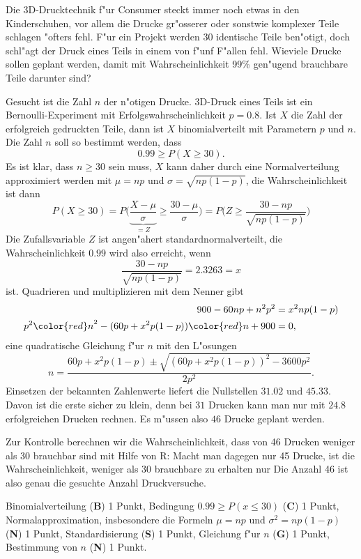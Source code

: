 Die 3D-Drucktechnik f"ur Consumer steckt immer noch etwas in den 
Kinderschuhen, vor allem die Drucke gr"osserer oder sonstwie komplexer
Teile schlagen "ofters fehl.
F"ur ein Projekt werden 30 identische Teile ben"otigt,
doch schl"agt der Druck eines Teils in einem von f"unf F"allen fehl.
Wieviele Drucke sollen geplant werden, damit mit Wahrscheinlichkeit 99\%
gen"ugend brauchbare Teile darunter sind?

\begin{loesung}
Gesucht ist die Zahl $n$ der n"otigen Drucke.
3D-Druck eines Teils ist ein Bernoulli-Experiment mit
Erfolgswahrscheinlichkeit $p=0.8$.
Ist $X$ die Zahl der erfolgreich gedruckten Teile, dann ist $X$
binomialverteilt mit Parametern $p$ und $n$.
Die Zahl $n$ soll so bestimmt werden, dass 
\[
0.99 \ge P(X\ge 30).
\]
Es ist klar, dass $n\ge 30$ sein muss, $X$ kann daher durch eine
Normalverteilung approximiert werden mit $\mu=np$ und $\sigma=\sqrt{np(1-p)}$,
die Wahrscheinlichkeit ist dann
\[
P(X\ge 30)=P\biggl(
\underbrace{\frac{X-\mu}{\sigma}}_{=Z}\ge\frac{30-\mu}{\sigma}
\biggr)
=P\biggl(Z\ge \frac{30-np}{\sqrt{np(1-p)}}\biggr)
\]
Die Zufallsvariable $Z$ ist angen"ahert standardnormalverteilt, die
Wahrscheinlichkeit $0.99$ wird also erreicht, wenn 
\[
\frac{30-np}{\sqrt{np(1-p)}} = 2.3263=x
\]
ist.
Quadrieren und multiplizieren mit dem Nenner gibt
\begin{align*}
900-60np+n^2p^2
&=
x^2 np(1-p)
\\
p^2{\color{red}n}^2-(60p+x^2p(1-p)){\color{red}n}+900&=0,
\end{align*}
eine quadratische Gleichung f"ur $n$ mit den L"osungen
\[
n=\frac{60p+x^2p(1-p)\pm\sqrt{(60p+x^2p(1-p))^2 - 3600p^2}}{2p^2}.
\]
Einsetzen der bekannten Zahlenwerte liefert die Nullstellen $31.02$ und $45.33$.
Davon ist die erste sicher zu klein, denn bei $31$ Drucken kann man nur mit $24.8$ erfolgreichen Drucken rechnen.
Es m"ussen also $46$ Drucke geplant werden.

Zur Kontrolle berechnen wir die Wahrscheinlichkeit, dass von 46 Drucken
weniger als 30 brauchbar sind mit Hilfe von R:
Macht man dagegen nur 45 Drucke, ist die Wahrscheinlichkeit, weniger als
30 brauchbare zu erhalten nur
Die Anzahl 46 ist also genau die gesuchte Anzahl Druckversuche.
\end{loesung}


\begin{bewertung}
Binomialverteilung ({\bf B}) 1 Punkt,
Bedingung $0.99 \ge P(x\le 30)$ ({\bf C}) 1 Punkt,
Normalapproximation, insbesondere die Formeln $\mu=np$ und $\sigma^2=np(1-p)$
({\bf N}) 1 Punkt,
Standardisierung ({\bf S}) 1 Punkt,
Gleichung f"ur $n$ ({\bf G}) 1 Punkt,
Bestimmung von $n$ ({\bf N}) 1 Punkt.
\end{bewertung}

